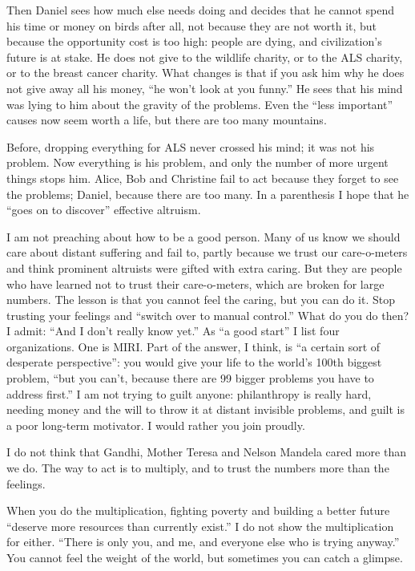 Then Daniel sees how much else needs doing and decides that he cannot spend his time or money on birds after all, not because they are not worth it, but because the opportunity cost is too high: people are dying, and civilization's future is at stake. He does not give to the wildlife charity, or to the ALS charity, or to the breast cancer charity. What changes is that if you ask him why he does not give away all his money, ``he won't look at you funny.'' He sees that his mind was lying to him about the gravity of the problems. Even the ``less important'' causes now seem worth a life, but there are too many mountains.

Before, dropping everything for ALS never crossed his mind; it was not his problem. Now everything is his problem, and only the number of more urgent things stops him. Alice, Bob and Christine fail to act because they forget to see the problems; Daniel, because there are too many. In a parenthesis I hope that he ``goes on to discover'' effective altruism.

I am not preaching about how to be a good person. Many of us know we should care about distant suffering and fail to, partly because we trust our care-o-meters and think prominent altruists were gifted with extra caring. But they are people who have learned not to trust their care-o-meters, which are broken for large numbers. The lesson is that you cannot feel the caring, but you can do it. Stop trusting your feelings and ``switch over to manual control.'' What do you do then? I admit: ``And I don't really know yet.'' As ``a good start'' I list four organizations. One is MIRI.  Part of the answer, I think, is ``a certain sort of desperate perspective'': you would give your life to the world's 100th biggest problem, ``but you can't, because there are 99 bigger problems you have to address first.'' I am not trying to guilt anyone: philanthropy is really hard, needing money and the will to throw it at distant invisible problems, and guilt is a poor long-term motivator. I would rather you join proudly.

I do not think that Gandhi, Mother Teresa and Nelson Mandela cared more than we do. The way to act is to multiply, and to trust the numbers more than the feelings. 

When you do the multiplication, fighting poverty and building a better future ``deserve more resources than currently exist.'' I do not show the multiplication for either. ``There is only you, and me, and everyone else who is trying anyway.'' You cannot feel the weight of the world, but sometimes you can catch a glimpse.
